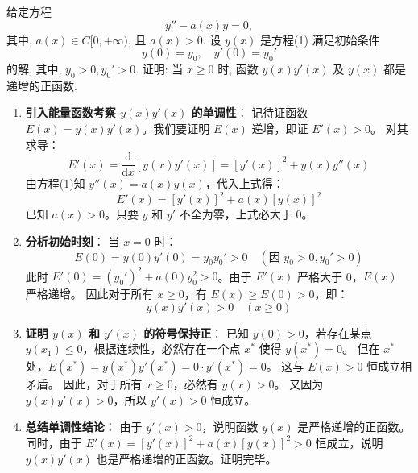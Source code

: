 \documentclass[lang=cn,11pt]{elegantbook}
\begin{document}
\begin{exercise}[二阶微分方程解的单调性分析]
给定方程
\[
y''-a(x)y = 0, \tag{1}
\]
其中, $a(x)\in C[0, +\infty)$, 且 $a(x)>0$. 设 $y(x)$ 是方程(1) 满足初始条件
\[
y(0)=y_0, \quad y'(0)=y_0' \tag{2}
\]
的解, 其中, $y_0>0, y_0'>0$. 证明: 当 $x\ge 0$ 时, 函数 $y(x)y'(x)$ 及 $y(x)$ 都是递增的正函数.
\end{exercise}
\begin{solution}
\begin{enumerate}
    \item \textbf{引入能量函数考察 $y(x)y'(x)$ 的单调性}：
    记待证函数 $E(x) = y(x)y'(x)$。我们要证明 $E(x)$ 递增，即证 $E'(x) > 0$。
    对其求导：
    \[
    E'(x) = \frac{\mathrm{d}}{\mathrm{d}x} [y(x)y'(x)] = [y'(x)]^2 + y(x)y''(x)
    \]
    由方程(1)知 $y''(x) = a(x)y(x)$，代入上式得：
    \[
    E'(x) = [y'(x)]^2 + a(x)[y(x)]^2
    \]
    已知 $a(x) > 0$。只要 $y$ 和 $y'$ 不全为零，上式必大于 0。
    
    \item \textbf{分析初始时刻}：
    当 $x=0$ 时：
    \[
    E(0) = y(0)y'(0) = y_0 y_0' > 0 \quad (\text{因 } y_0>0, y_0'>0)
    \]
    此时 $E'(0) = (y_0')^2 + a(0)y_0^2 > 0$。由于 $E'(x)$ 严格大于 0，$E(x)$ 严格递增。
    因此对于所有 $x \ge 0$，有 $E(x) \ge E(0) > 0$，即：
    \[
    y(x)y'(x) > 0 \quad (x \ge 0)
    \]
    
    \item \textbf{证明 $y(x)$ 和 $y'(x)$ 的符号保持正}：
    已知 $y(0) > 0$，若存在某点 $y(x_1) \le 0$，根据连续性，必然存在一个点 $x^*$ 使得 $y(x^*) = 0$。
    但在 $x^*$ 处，$E(x^*) = y(x^*)y'(x^*) = 0 \cdot y'(x^*) = 0$。
    这与 $E(x) > 0$ 恒成立相矛盾。
    因此，对于所有 $x \ge 0$，必然有 $y(x) > 0$。
    又因为 $y(x)y'(x) > 0$，所以 $y'(x) > 0$ 恒成立。
    
    \item \textbf{总结单调性结论}：
    由于 $y'(x) > 0$，说明函数 $y(x)$ 是严格递增的正函数。
    同时，由于 $E'(x) = [y'(x)]^2 + a(x)[y(x)]^2 > 0$ 恒成立，说明 $y(x)y'(x)$ 也是严格递增的正函数。证明完毕。
\end{enumerate}
\end{solution}
\end{document}
